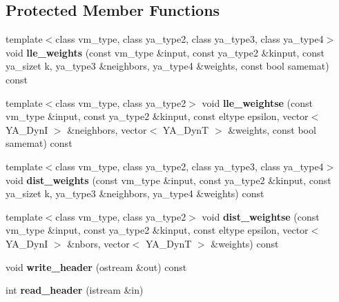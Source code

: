 \subsection*{Protected Member Functions}
\begin{CompactItemize}
\item 
\hypertarget{class_y_a_dim_reduce_b0}{
template$<$class vm\_\-type, class ya\_\-type2, class ya\_\-type3, class ya\_\-type4$>$ void {\bf lle\_\-weights} (const vm\_\-type \&input, const ya\_\-type2 \&kinput, const ya\_\-sizet k, ya\_\-type3 \&neighbors, ya\_\-type4 \&weights, const bool samemat) const }
\label{class_y_a_dim_reduce_b0}

\item 
\hypertarget{class_y_a_dim_reduce_b1}{
template$<$class vm\_\-type, class ya\_\-type2$>$ void {\bf lle\_\-weightse} (const vm\_\-type \&input, const ya\_\-type2 \&kinput, const eltype epsilon, vector$<$ YA\_\-Dyn\-I $>$ \&neighbors, vector$<$ YA\_\-Dyn\-T $>$ \&weights, const bool samemat) const }
\label{class_y_a_dim_reduce_b1}

\item 
\hypertarget{class_y_a_dim_reduce_b2}{
template$<$class vm\_\-type, class ya\_\-type2, class ya\_\-type3, class ya\_\-type4$>$ void {\bf dist\_\-weights} (const vm\_\-type \&input, const ya\_\-type2 \&kinput, const ya\_\-sizet k, ya\_\-type3 \&neighbors, ya\_\-type4 \&weights) const }
\label{class_y_a_dim_reduce_b2}

\item 
\hypertarget{class_y_a_dim_reduce_b3}{
template$<$class vm\_\-type, class ya\_\-type2$>$ void {\bf dist\_\-weightse} (const vm\_\-type \&input, const ya\_\-type2 \&kinput, const eltype epsilon, vector$<$ YA\_\-Dyn\-I $>$ \&nbors, vector$<$ YA\_\-Dyn\-T $>$ \&weights) const }
\label{class_y_a_dim_reduce_b3}

\item 
\hypertarget{class_y_a_dim_reduce_b4}{
void {\bf write\_\-header} (ostream \&out) const }
\label{class_y_a_dim_reduce_b4}

\item 
\hypertarget{class_y_a_dim_reduce_b5}{
int {\bf read\_\-header} (istream \&in)}
\label{class_y_a_dim_reduce_b5}

\end{CompactItemize}
